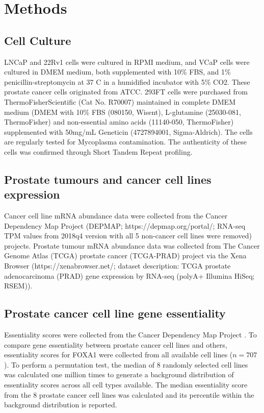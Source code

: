 \section{Methods}
\label{sec:FOXA1_methods}

\subsection{Cell Culture}

LNCaP and 22Rv1 cells were cultured in RPMI medium, and VCaP cells were cultured in DMEM medium, both supplemented with 10\% FBS, and 1\% penicillin-streptomycin at 37 \textdegree C in a humidified incubator with 5\% CO2.
These prostate cancer cells originated from ATCC.
293FT cells were purchased from ThermoFisherScientific (Cat No. R70007) maintained in complete DMEM medium (DMEM with 10\% FBS (080150, Wisent), L-glutamine (25030-081, ThermoFisher) and non-essential amino acids (11140-050, ThermoFisher) supplemented with 50mg/mL Geneticin (4727894001, Sigma-Aldrich).
The cells are regularly tested for Mycoplasma contamination.
The authenticity of these cells was confirmed through Short Tandem Repeat profiling.

\subsection{Prostate tumours and cancer cell lines expression}

Cancer cell line mRNA abundance data were collected from the Cancer Dependency Map Project (DEPMAP; https://depmap.org/portal/; RNA-seq TPM values from 2018q4 version with all 5 non-cancer cell lines were removed) \cite{thecancercelllineencyclopediaconsortiumPharmacogenomicAgreementTwo2015} projects.
Prostate tumour mRNA abundance data was collected from The Cancer Genome Atlas (TCGA) prostate cancer (TCGA-PRAD) project via the Xena Browser (https://xenabrowser.net/; dataset description: TCGA prostate adenocarcinoma (PRAD) gene expression by RNA-seq (polyA+ Illumina HiSeq; RSEM)).

\subsection{Prostate cancer cell line gene essentiality}

Essentiality scores were collected from the Cancer Dependency Map Project \cite{mcfarlandImprovedEstimationCancer2018}.
To compare gene essentiality between prostate cancer cell lines and others, essentiality scores for FOXA1 were collected from all available cell lines ($n = 707$).
To perform a permutation test, the median of 8 randomly selected cell lines was calculated one million times to generate a background distribution of essentiality scores across all cell types available.
The median essentiality score from the 8 prostate cancer cell lines was calculated and its percentile within the background distribution is reported.

